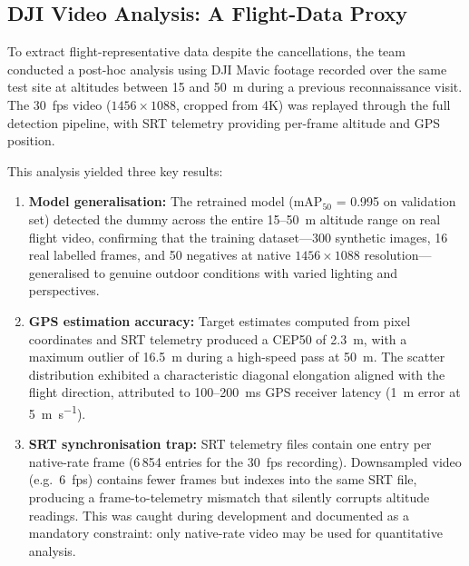 \subsection{DJI Video Analysis: A Flight-Data Proxy}\label{sec:field-dji}

To extract flight-representative data despite the cancellations, the team conducted a post-hoc analysis using DJI Mavic footage recorded over the same test site at altitudes between 15 and 50~m during a previous reconnaissance visit.  The 30~fps video ($1456 \times 1088$, cropped from 4K) was replayed through the full detection pipeline, with SRT telemetry providing per-frame altitude and GPS position.

This analysis yielded three key results:

\begin{enumerate}
    \item \textbf{Model generalisation:} The retrained model (mAP$_{50}$ = 0.995 on validation set) detected the dummy across the entire 15--50~m altitude range on real flight video, confirming that the training dataset---300 synthetic images, 16 real labelled frames, and 50 negatives at native $1456 \times 1088$ resolution---generalised to genuine outdoor conditions with varied lighting and perspectives.
    \item \textbf{GPS estimation accuracy:} Target estimates computed from pixel coordinates and SRT telemetry produced a CEP50 of \SI{2.3}{\metre}, with a maximum outlier of \SI{16.5}{\metre} during a high-speed pass at \SI{50}{\metre}.  The scatter distribution exhibited a characteristic diagonal elongation aligned with the flight direction, attributed to 100--200~ms GPS receiver latency (\SI{1}{\metre} error at \SI{5}{\metre\per\second}).
    \item \textbf{SRT synchronisation trap:} SRT telemetry files contain one entry per native-rate frame (6\,854 entries for the 30~fps recording).  Downsampled video (e.g.\ 6~fps) contains fewer frames but indexes into the same SRT file, producing a frame-to-telemetry mismatch that silently corrupts altitude readings.  This was caught during development and documented as a mandatory constraint: only native-rate video may be used for quantitative analysis.
\end{enumerate}


